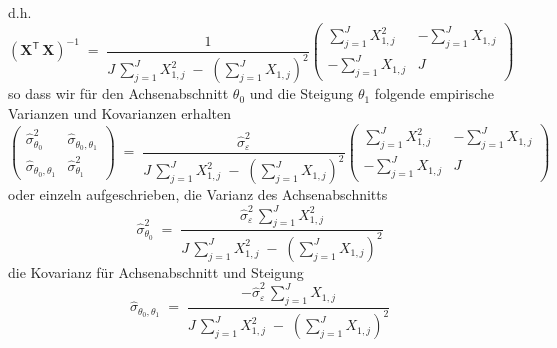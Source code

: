 d.h.
\begin{equation}
\left( \mathbf{X}^\mathsf{T}  \, \mathbf{X} \right)^{-1} \; = \;
\frac{1}{J \, \sum\limits_{j=1}^J X_{1,j}^2 \; - \;
	\left(\sum\limits_{j=1}^J X_{1,j}\right)^2}
\left(
\begin{array}{ccc}
\sum\limits_{j=1}^J X_{1,j}^2 & -\sum\limits_{j=1}^J X_{1,j} \\
-\sum\limits_{j=1}^J X_{1,j} & J
\end{array}
\right)
\end{equation}
so dass wir für den Achsenabschnitt $\theta_0$ und die Steigung $\theta_1$ folgende
empirische Varianzen und Kovarianzen erhalten
\begin{equation}
\left(\begin{array}{cc}
\hat \sigma^2_{\theta_0} &\hat \sigma_{\theta_0, \theta_1}\\
\hat \sigma_{\theta_0, \theta_1} & \hat \sigma^2_{\theta_1} 
\end{array}\right)
\; = \;
\frac{\hat \sigma^2_\varepsilon}{J \, \sum\limits_{j=1}^J X_{1,j}^2 \; - \; 
	\left(\sum\limits_{j=1}^J X_{1,j}\right)^2}
\left(
\begin{array}{ccc}
\sum\limits_{j=1}^J X_{1,j}^2 & -\sum\limits_{j=1}^J X_{1,j} \\
-\sum\limits_{j=1}^J X_{1,j} & J
\end{array}
\right)
\end{equation}
oder einzeln aufgeschrieben, die Varianz des Achsenabschnitts
\begin{equation}
\hat \sigma^2_{\theta_0} \; = \; 
\frac{\hat \sigma^2_\varepsilon \, \sum\limits_{j=1}^J X_{1,j}^2}{J \, 
	\sum\limits_{j=1}^J X_{1,j}^2 \; - \; \left(\sum\limits_{j=1}^J X_{1,j}\right)^2}
\label{eq:Varianz des Achsenabschnitts}
\end{equation}
die Kovarianz für Achsenabschnitt und Steigung
\begin{equation}
\hat \sigma_{\theta_0, \theta_1} \; = \; 
\frac{- \hat \sigma^2_\varepsilon \, \sum\limits_{j=1}^J X_{1,j}}{J \, \sum_{j=1}^J X_{1,j}^2 \;
	- \; \left(\sum\limits_{j=1}^J X_{1,j}\right)^2}
\end{equation}
